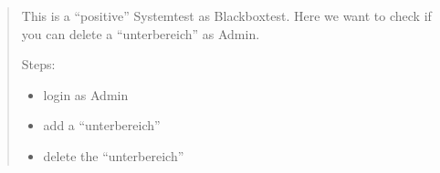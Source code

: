 \documentclass[letterpaper,10pt,english]{sphinxmanual}
\begin{document}
\begin{quote}
\begin{fulllineitems}
\begin{fulllineitems}
This is a “positive” Systemtest as Blackboxtest.
Here we want to check if you can delete a “unterbereich” as Admin.

Steps:
\begin{itemize}
\item {} 
login as Admin

\item {} 
add a “unterbereich”

\item {} 
delete the “unterbereich”

\end{itemize}

\end{fulllineitems}


\end{fulllineitems}

\end{quote}
\end{document}
